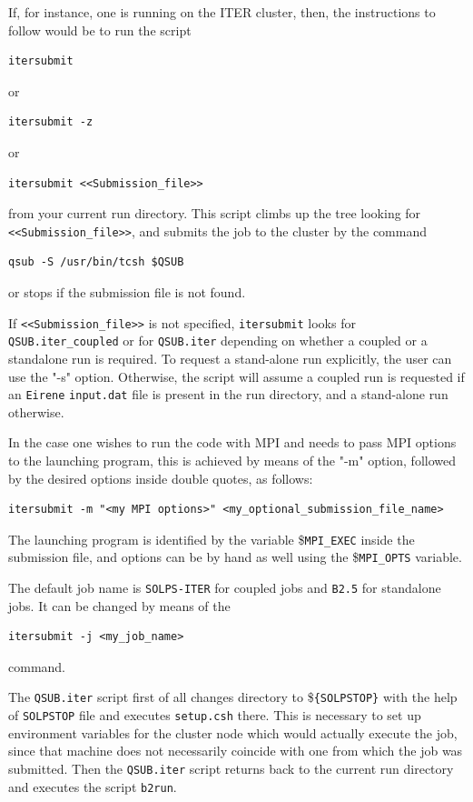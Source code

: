 \documentclass[a4paper,10pt]{report}
\begin{document}
If, for instance, one is running on the ITER cluster, then, the instructions to follow would be to run the script
\begin{verbatim}
itersubmit
\end{verbatim}
or
\begin{verbatim}
itersubmit -z
\end{verbatim}
or
\begin{verbatim}
itersubmit <<Submission_file>>
\end{verbatim}
from your current run directory. This script climbs up the tree looking for {\tt <<Submission\_file>>},
and submits the job to the cluster by the command
\begin{verbatim}
qsub -S /usr/bin/tcsh $QSUB
\end{verbatim}
or stops if the submission file is not found.

If {\tt <<Submission\_file>>} is not specified, {\tt itersubmit} looks for {\tt QSUB.iter\_coupled} or
for {\tt QSUB.iter} depending on whether a coupled or a standalone run is required. To request a stand-alone run explicitly, the user can use the "-s" option. Otherwise, the script will assume a coupled run is requested if an {\tt Eirene} {\tt input.dat} file is present in the run directory, and a stand-alone run otherwise.

In the case one wishes to run the code with MPI and needs to pass MPI options to the launching program, this is achieved by means of the "-m" option, followed by the desired options inside double quotes, as follows:
\begin{verbatim}
itersubmit -m "<my MPI options>" <my_optional_submission_file_name>
\end{verbatim}
The launching program is identified by the variable \${\tt MPI\_EXEC} inside the submission file, and options can be by hand as well using the \${\tt MPI\_OPTS} variable.

The default job name is {\tt SOLPS-ITER} for coupled jobs and {\tt B2.5} for standalone jobs. It can be changed by means of the
\begin{verbatim}
itersubmit -j <my_job_name>
\end{verbatim}
command.

The {\tt QSUB.iter} script first of all changes directory to \${\tt \{SOLPSTOP\}}
with the help of {\tt SOLPSTOP} file
and executes {\tt setup.csh} there. This is necessary
to set up environment variables for the cluster node
which would actually execute the job, since that machine
does not necessarily coincide with one from which the job was submitted.
Then the {\tt QSUB.iter} script returns back to the current run directory
and executes the script {\tt b2run}.
\end{document}
